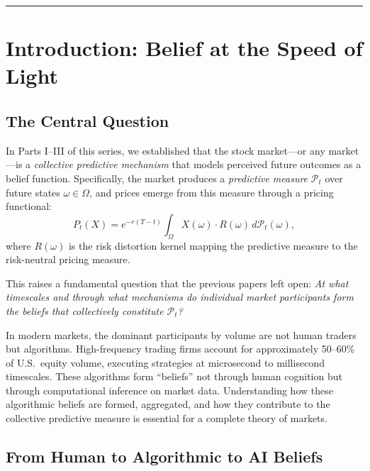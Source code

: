 \documentclass[12pt,a4paper]{article}
\theoremstyle{definition}
\newcommand{\PP}{\mathcal{P}}
\begin{document}
\vspace{6pt}
\hrule
\vspace{12pt}

\tableofcontents
\newpage

\section{Introduction: Belief at the Speed of Light}

\subsection{The Central Question}

In Parts I--III of this series, we established that the stock market---or any market---is a \emph{collective predictive mechanism} that models perceived future outcomes as a belief function. Specifically, the market produces a \emph{predictive measure} $\PP_t$ over future states $\omega \in \Omega$, and prices emerge from this measure through a pricing functional:
\begin{equation}\label{eq:pricing-functional}
  P_t(X) = e^{-r(T-t)} \int_\Omega X(\omega) \cdot R(\omega)\, d\PP_t(\omega),
\end{equation}
where $R(\omega)$ is the risk distortion kernel mapping the predictive measure to the risk-neutral pricing measure.

This raises a fundamental question that the previous papers left open: \emph{At what timescales and through what mechanisms do individual market participants form the beliefs that collectively constitute $\PP_t$?}

In modern markets, the dominant participants by volume are not human traders but algorithms. High-frequency trading firms account for approximately 50--60\% of U.S.\ equity volume, executing strategies at microsecond to millisecond timescales. These algorithms form ``beliefs'' not through human cognition but through computational inference on market data. Understanding how these algorithmic beliefs are formed, aggregated, and how they contribute to the collective predictive measure is essential for a complete theory of markets.

\subsection{From Human to Algorithmic to AI Beliefs}
\end{document}
